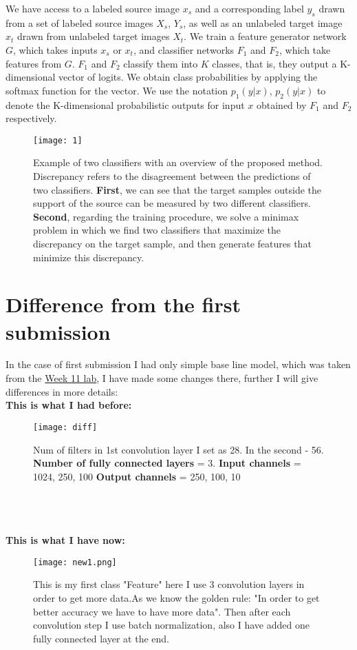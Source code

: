 \documentclass{article}
\begin{document}
We have access to a labeled source image $x_s$ and a corresponding label $y_s$ drawn from a set of labeled source images
{$X_s$, $Y_s$}, as well as an unlabeled target image $x_t$ drawn
from unlabeled target images $X_t$. We train a feature generator network $G$, which takes inputs $x_s$ or $x_t$, and classifier
networks $F_1$ and $F_2$, which take features from $G$. $F_1$ and
$F_2$ classify them into $K$ classes, that is, they output a K-dimensional vector of logits. We obtain class probabilities
by applying the softmax function for the vector. We use
the notation $p_1(y|x)$, $p_2(y|x)$ to denote the K-dimensional
probabilistic outputs for input $x$ obtained by $F_1$ and $F_2$ respectively.

\begin{figure}[h!]
\centering
\texttt{[image: 1]}
\caption{\citep{two} Example of two classifiers with an overview of the proposed method. Discrepancy refers to the disagreement between the predictions of two classifiers. \textbf{First}, we can see that the target samples outside the support of the source can be measured
by two different classifiers. \textbf{Second}, regarding the training procedure, we solve a minimax problem in
which we find two classifiers that maximize the discrepancy on the target sample, and then generate features that minimize this discrepancy.}
\label{fig:1}
\end{figure}


\section{Difference from the first submission}
In the case of first submission I had only simple base line model, which was taken from the \href{https://colab.research.google.com/drive/1oVLY8B5NhT62-_XtqUYWrMzBPSfuasu2}{Week 11 lab}, I have made some changes there, further I will give differences in more details:\\
\textbf{This is what I had before:}
\begin{figure}[h!]
\centering
\texttt{[image: diff]}
\caption{Num of filters in 1st convolution layer I set as 28.
In the second - 56.
\textbf{Number of fully connected layers} = 3. 
\textbf{Input channels} = 1024, 250, 100
\textbf{Output channels} = 250, 100, 10}
\label{fig:diff}
\end{figure}\\ 
\\
\\

\textbf{This is what I have now:}\\
\begin{figure}[h!]
\centering
\texttt{[image: new1.png]}
\caption{This is my first class "Feature" here I use 3 convolution layers in order to get more data.As we know the golden rule: "In order to get better accuracy we have to have more data". Then after each convolution step I use batch normalization, also I have added one fully connected layer at the end.}
\label{fig:new1}
\end{figure}
\end{document}
